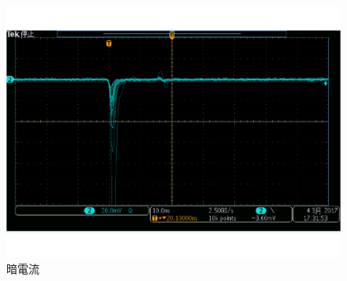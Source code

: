 \begin{figure}[H]
\centering
\includegraphics[keepaspectratio,scale=0.3]{fig/ybm/oscillo2.pdf}
\caption{暗電流}
\label{fig:oscillo2}
\end{figure}

